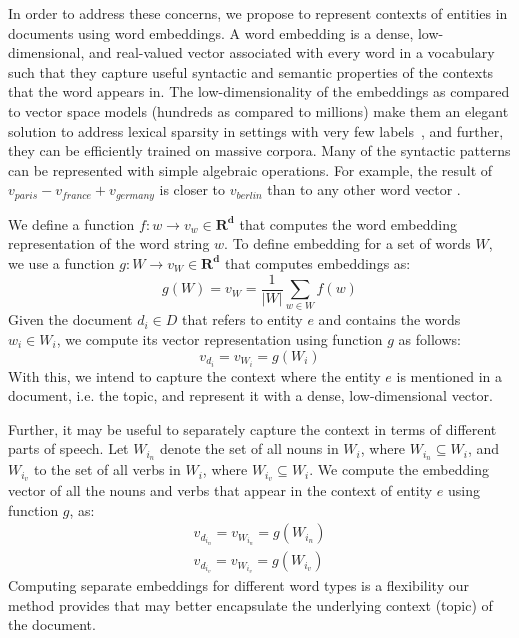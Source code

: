 \documentclass{article}
\begin{document}
In order to address these concerns, we propose to represent contexts of entities in documents using word embeddings.
A word embedding is a dense, low-dimensional, and real-valued vector associated with every word in a vocabulary such that they capture useful syntactic and semantic properties of the contexts that the word appears in.
The low-dimensionality of the embeddings as compared to vector space models (hundreds as compared to millions) make them an elegant solution to address lexical sparsity in settings with very few labels~\cite{Turian10wordrepresentations}, and further, they can be efficiently trained on massive corpora.
Many of the syntactic patterns can be represented with simple algebraic operations. For example, the result of $v_{paris} - v_{france} + v_{germany}$ is closer to $v_{berlin}$ than to any other word vector \cite{mikolovChen,mikolovYih}.


We define a function $f : w \rightarrow v_w \in \mathbf{R^d}$ that computes the word embedding representation of the word string $w$. 
To define embedding for a set of words $W$, we use a function $g : W \rightarrow v_W \in \mathbf{R^d}$ that computes embeddings as: %
\begin{equation}
\label{wordembedding}
g(W) = v_W = \frac{1}{|W|} \sum_{w \in W}{f(w)}
\end{equation}
Given the document $d_i \in D$ that refers to entity $e$ and contains the words $w_i \in W_i$, we compute its vector representation using function $g$ as follows:
\begin{equation}
\label{wordembedding1}
v_{d_i} = v_{W_i} = g(W_i)
\end{equation}
With this, we intend to capture the context where the entity $e$ is mentioned in a document, i.e. the topic, and represent it with a dense, low-dimensional vector.

Further, it may be useful to separately capture the context in terms of different parts of speech.
Let $W_{i_n}$ denote the set of all nouns in $W_i$, where $W_{i_n} \subseteq W_i$, and $W_{i_v}$ to the set of all verbs in $W_i$, where $W_{i_v} \subseteq W_i$. We compute the embedding vector of all the nouns and verbs that appear in the context of entity $e$ using function $g$, as: %
\begin{eqnarray}
v_{d_{i_n}} = v_{W_{i_n}} = g(W_{i_n})\label{nouns}
\\
v_{d_{i_v}} = v_{W_{i_v}} = g(W_{i_v})\label{verbs}
\end{eqnarray}
Computing separate embeddings for different word types is a flexibility our method provides that may better encapsulate the underlying context (topic) of the document.
\end{document}
